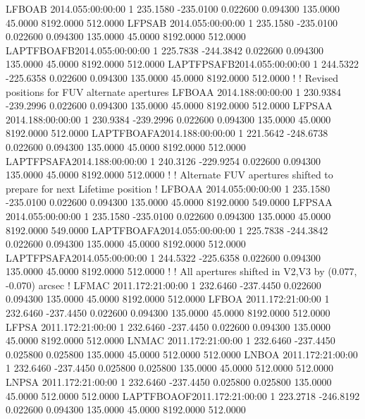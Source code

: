 LFBOAB    2014.055:00:00:00  1    235.1580   -235.0100    0.022600    0.094300    135.0000     45.0000   8192.0000    512.0000
LFPSAB    2014.055:00:00:00  1    235.1580   -235.0100    0.022600    0.094300    135.0000     45.0000   8192.0000    512.0000
LAPTFBOAFB2014.055:00:00:00  1    225.7838   -244.3842    0.022600    0.094300    135.0000     45.0000   8192.0000    512.0000
LAPTFPSAFB2014.055:00:00:00  1    244.5322   -225.6358    0.022600    0.094300    135.0000     45.0000   8192.0000    512.0000
!
! Revised positions for FUV alternate apertures
LFBOAA    2014.188:00:00:00  1    230.9384   -239.2996    0.022600    0.094300    135.0000     45.0000   8192.0000    512.0000
LFPSAA    2014.188:00:00:00  1    230.9384   -239.2996    0.022600    0.094300    135.0000     45.0000   8192.0000    512.0000
LAPTFBOAFA2014.188:00:00:00  1    221.5642   -248.6738    0.022600    0.094300    135.0000     45.0000   8192.0000    512.0000
LAPTFPSAFA2014.188:00:00:00  1    240.3126   -229.9254    0.022600    0.094300    135.0000     45.0000   8192.0000    512.0000
!
! Alternate FUV apertures shifted to prepare for next Lifetime position
!
LFBOAA    2014.055:00:00:00  1    235.1580   -235.0100    0.022600    0.094300    135.0000     45.0000   8192.0000    549.0000
LFPSAA    2014.055:00:00:00  1    235.1580   -235.0100    0.022600    0.094300    135.0000     45.0000   8192.0000    549.0000
LAPTFBOAFA2014.055:00:00:00  1    225.7838   -244.3842    0.022600    0.094300    135.0000     45.0000   8192.0000    512.0000
LAPTFPSAFA2014.055:00:00:00  1    244.5322   -225.6358    0.022600    0.094300    135.0000     45.0000   8192.0000    512.0000
!
! All apertures shifted in V2,V3 by (0.077, -0.070) arcsec
!
LFMAC     2011.172:21:00:00  1    232.6460   -237.4450    0.022600    0.094300    135.0000     45.0000   8192.0000    512.0000
LFBOA     2011.172:21:00:00  1    232.6460   -237.4450    0.022600    0.094300    135.0000     45.0000   8192.0000    512.0000
LFPSA     2011.172:21:00:00  1    232.6460   -237.4450    0.022600    0.094300    135.0000     45.0000   8192.0000    512.0000
LNMAC     2011.172:21:00:00  1    232.6460   -237.4450    0.025800    0.025800    135.0000     45.0000    512.0000    512.0000
LNBOA     2011.172:21:00:00  1    232.6460   -237.4450    0.025800    0.025800    135.0000     45.0000    512.0000    512.0000
LNPSA     2011.172:21:00:00  1    232.6460   -237.4450    0.025800    0.025800    135.0000     45.0000    512.0000    512.0000
LAPTFBOAOF2011.172:21:00:00  1    223.2718   -246.8192    0.022600    0.094300    135.0000     45.0000   8192.0000    512.0000
